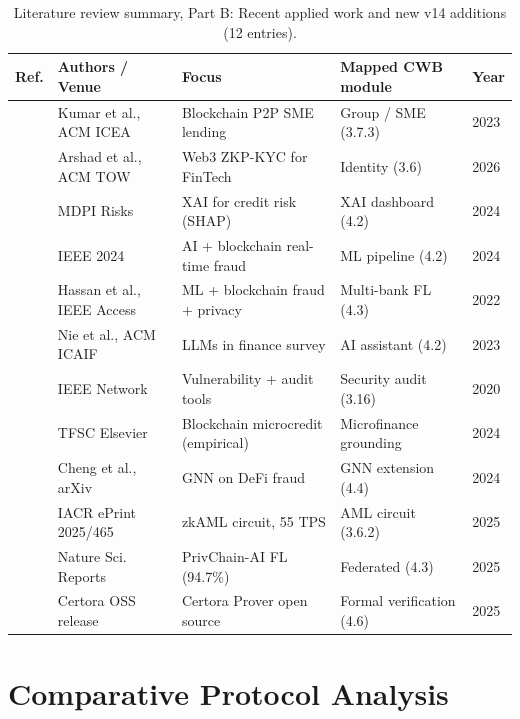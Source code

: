 \documentclass[12pt,a4paper]{report}
\begin{document}
\begin{table}[!t]
\centering
\caption{Literature review summary, Part B: Recent applied work and new v14 additions (12 entries).}
\label{tab:lit-summary-b}
\small
\begin{tabularx}{\linewidth}{@{}p{1.6cm}p{2.5cm}YY l@{}}
\toprule
\textbf{Ref.} & \textbf{Authors / Venue} & \textbf{Focus} & \textbf{Mapped CWB module} & \textbf{Year} \\
\midrule
\cite{kumar2023p2pSme} & Kumar et al., ACM ICEA & Blockchain P2P SME lending & Group / SME (3.7.3) & 2023 \\
\cite{arshad2026web3identity} & Arshad et al., ACM TOW & Web3 ZKP-KYC for FinTech & Identity (3.6) & 2026 \\
\cite{xaiCreditRisk2024} & MDPI Risks & XAI for credit risk (SHAP) & XAI dashboard (4.2) & 2024 \\
\cite{aiblockchainFraud2024} & IEEE 2024 & AI + blockchain real-time fraud & ML pipeline (4.2) & 2024 \\
\cite{hassan2022mlblockchain} & Hassan et al., IEEE Access & ML + blockchain fraud + privacy & Multi-bank FL (4.3) & 2022 \\
\cite{nie2023llmFinance} & Nie et al., ACM ICAIF & LLMs in finance survey & AI assistant (4.2) & 2023 \\
\cite{smartContractVuln2020} & IEEE Network & Vulnerability + audit tools & Security audit (3.16) & 2020 \\
\cite{toufaily2024microcredit} & TFSC Elsevier & Blockchain microcredit (empirical) & Microfinance grounding & 2024 \\
\cite{cheng2024gnnFraud} & Cheng et al., arXiv & GNN on DeFi fraud & GNN extension (4.4) & 2024 \\
\cite{zkAml2025} & IACR ePrint 2025/465 & zkAML circuit, 55 TPS & AML circuit (3.6.2) & 2025 \\
\cite{privchainAi2025} & Nature Sci. Reports & PrivChain-AI FL (94.7\%) & Federated (4.3) & 2025 \\
\cite{certoraOpenSource2025} & Certora OSS release & Certora Prover open source & Formal verification (4.6) & 2025 \\
\bottomrule
\end{tabularx}
\end{table}

\section{Comparative Protocol Analysis}
\label{sec:comparative}
\end{document}
